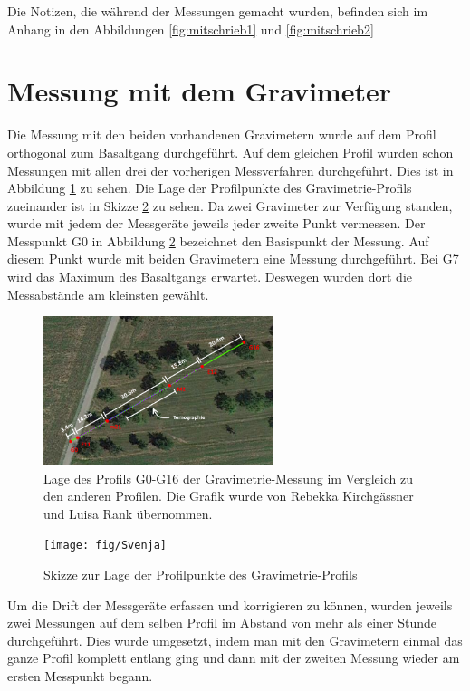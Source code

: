 Die Notizen, die während der Messungen gemacht wurden, befinden sich im Anhang in den Abbildungen \ref{fig:mitschrieb1} und \ref{fig:mitschrieb2}

\section{Messung mit dem Gravimeter}

Die Messung mit den beiden vorhandenen Gravimetern wurde auf dem Profil orthogonal zum Basaltgang durchgeführt. Auf dem gleichen Profil wurden schon Messungen mit allen drei der vorherigen Messverfahren durchgeführt. Dies ist in Abbildung \ref{fig:Luisa} zu sehen. Die Lage der Profilpunkte des Gravimetrie-Profils zueinander ist in Skizze \ref{fig:Svenja} zu sehen. Da zwei Gravimeter zur Verfügung standen, wurde mit jedem der Messgeräte jeweils jeder zweite Punkt vermessen. Der Messpunkt G0 in Abbildung \ref{fig:Svenja} bezeichnet den Basispunkt der Messung. Auf
diesem Punkt wurde mit beiden Gravimetern eine Messung durchgeführt. Bei G7 wird das Maximum des Basaltgangs erwartet. Deswegen wurden dort die Messabstände am kleinsten gewählt.

\begin{figure}[!ht]
 \centering
 \includegraphics[width=0.6\textwidth]{fig/Luisa}
 \caption[Lage des Profils G0-G16 der Gravimetrie-Messung im Vergleich zu den anderen Profilen]{Lage des Profils G0-G16 der Gravimetrie-Messung im Vergleich zu den anderen Profilen. Die Grafik wurde von Rebekka Kirchgässner und Luisa Rank übernommen.}
 \label{fig:Luisa}
\end{figure}

\begin{figure}[!ht]
 \centering
 \texttt{[image: fig/Svenja]}
 \caption{ Skizze zur Lage der Profilpunkte des Gravimetrie-Profils}
 \label{fig:Svenja}
\end{figure}

Um die Drift der Messgeräte erfassen und korrigieren zu können, wurden jeweils zwei Messungen auf dem selben Profil im Abstand von mehr als einer Stunde durchgeführt. Dies wurde umgesetzt, indem man mit den Gravimetern einmal das ganze Profil komplett entlang ging und dann mit der zweiten Messung wieder am ersten Messpunkt begann.


